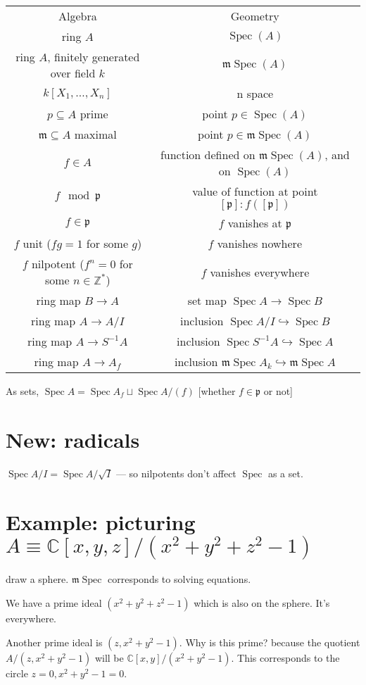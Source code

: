\documentclass{book}
\newcommand{\Z}{\ensuremath{\mathbb{Z}}}
\newcommand{\C}{\ensuremath{\mathbb{C}}}
\newcommand{\spec}{\operatorname{Spec}}
\newcommand{\m}{\mathfrak{m}}
\newcommand{\p}{\mathfrak{p}}
\newcommand{\mspec}{\m\operatorname{Spec}}
\newcommand{\inv}{\ensuremath{-1}}
\theoremstyle{definition}
\begin{document}
\begin{tabular}{cc}
Algebra & Geometry \\
ring $A$ & $\spec(A)$ \\
ring $A$, finitely generated over field $k$ & $\mspec(A)$ \\
$k[X_1, \dots, X_n]$ & n space \\
$p \subseteq A$ prime & point $p \in \spec(A)$ \\
\(\m \subseteq A\) maximal & point \(p \in \mspec(A)\) \\
$f \in A$ &  function defined on $\mspec(A)$, and on $\spec(A)$ \\
$f \mod \p$ &  value of function  at point $[\p]: f([\p])$ \\
$f \in \p$ &  $f$ vanishes at $\p$  \\
$f$ unit ($fg = 1$ for some $g$) &  $f$ vanishes nowhere \\
$f$ nilpotent ($f^n = 0$ for some $n \in \Z^*$) &  $f$ vanishes everywhere \\
ring map $B \rightarrow A$ & set map $\spec A \rightarrow \spec B$ \\
ring map $A \rightarrow A/I$ & inclusion $\spec A/I \hookrightarrow \spec B$ \\
ring map $A \rightarrow S^\inv A$ & inclusion $\spec S^\inv A \hookrightarrow \spec A$ \\
ring map $A \rightarrow A_f$ & inclusion $\mspec A_k \hookrightarrow \mspec A$ \\
\end{tabular}

As sets, $\spec A = \spec A_f \sqcup \spec A/(f)$ [whether $f \in \p$ or not]

\section{New: radicals}
$\spec A/I = \spec A/\sqrt{I}$ --- so nilpotents don't affect $\spec$ as a set.

\section{Example: picturing $A \equiv \C[x, y, z]/ (x^2 + y^2 + z^2 - 1)$}
draw a sphere. $\mspec$ corresponds to solving equations. 

We have a prime ideal $(x^2 + y^2 + z^2 - 1)$ which is also on the sphere.
It's everywhere. 


Another prime ideal is $(z, x^2 + y^2 - 1)$. Why is this prime? because
the quotient $A/ (z, x^2 + y^2 - 1)$ will be $\C[x, y] / (x^2 + y^2 - 1)$.
This corresponds to the circle $z = 0, x^2 + y^2 - 1 = 0$.
\end{document}
